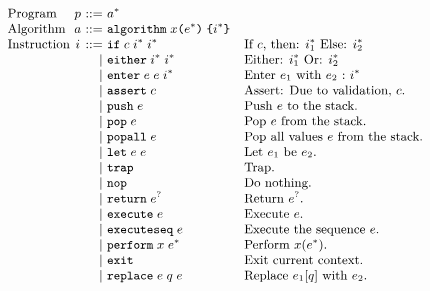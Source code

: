 \begin{figure}[t]
\[
\small
\begin{array}{l@{~}c@{~}r@{~}lll}
\text{Program} & \prog &::=& \alg^*\\
\text{Algorithm} & \alg &::=&
\kwalg \; \varx \kwrl \expr^* \kwrr \; \kwcl \inst^* \kwcr \\
\text{Instruction} & \inst &::=&
    \kwif \; \cond \; \inst^* \; \inst^* & \mbox{If $\cond$, then: $\inst_1^*$ Else: $\inst_2^*$}\\
&& \mid&
  \kweither \; \inst^* \; \inst^* & \mbox{Either: $\inst_1^*$ Or: $\inst_2^*$}\\
&& \mid&
  \kwenter \; \expr \; \expr \; \inst^* & \mbox{Enter $\expr_1$ with $\expr_2$\ :\ $\inst^*$}\\
&& \mid&
  \kwassert \; \cond  & \mbox{Assert: Due to validation, $\cond$.}\\
&& \mid&
  \kwpush \; \expr  & \mbox{Push $\expr$ to the stack.}\\
&& \mid&
  \kwpop \; \expr  & \mbox{Pop $\expr$ from the stack.}\\
&& \mid&
  \kwpopall \; \expr  & \mbox{Pop all values $\expr$ from the stack.}\\
&& \mid&
  \kwlet \; \expr \; \expr & \mbox{Let $\expr_1$ be $\expr_2$.}\\
&& \mid&
  \kwtrap & \mbox{Trap.}\\
&& \mid&
  \kwnop & \mbox{Do nothing.}\\
&& \mid&
  \kwreturn \; \expr^? & \mbox{Return $\expr^?$.}\\
&& \mid&
  \kwexecute \; \expr & \mbox{Execute $\expr$.}\\
&& \mid&
  \kwexecuteseq \; \expr & \mbox{Execute the sequence $\expr$.}\\
&& \mid&
  \kwperform \; \varx \; \expr^* & \mbox{Perform $\varx(\expr^*)$.}\\
&& \mid&
  \kwexit & \mbox{Exit current context.}\\
&& \mid&
    \kwreplace \; \expr \; \qual \; \expr & \mbox{Replace $\expr_1[\qual]$ with $\expr_2$.}
\\


\end{array}\]
\end{figure}
